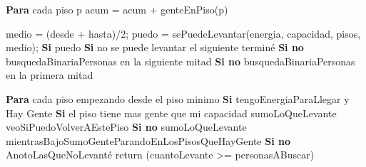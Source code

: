 \begin{codebox}
\li		\textbf{Para} cada piso p \Do
\li			acum = acum + genteEnPiso(p) \End
\end{codebox}

\begin{codebox}
\li		medio = (desde + hasta)/2;
\li		puedo = sePuedeLevantar(energia, capacidad, pisos, medio);
\li 		\textbf{Si} puedo \Do
\li				\textbf{Si} no se puede levantar el siguiente terminé
\li 				\textbf{Si no} busquedaBinariaPersonas en la siguiente mitad \End
\li 		\textbf{Si no} busquedaBinariaPersonas en la primera mitad
\end{codebox}

\begin{codebox}
\li 		\textbf{Para} cada piso empezando desde el piso minimo \Do
\li			\textbf{Si} tengoEnergiaParaLlegar y Hay Gente \Do
\li				\textbf{Si} el piso tiene mas gente que mi capacidad \Do
\li					sumoLoQueLevante
\li					veoSiPuedoVolverAEstePiso \End
\li				\textbf{Si no} \Do
\li					sumoLoQueLevante
\li					mientrasBajoSumoGenteParandoEnLosPisosQueHayGente \End \End
\li			\textbf{Si no} \Do
\li				AnotoLasQueNoLevanté \End \End
\li		return (cuantoLevante >= personasABuscar)
\end{codebox}


